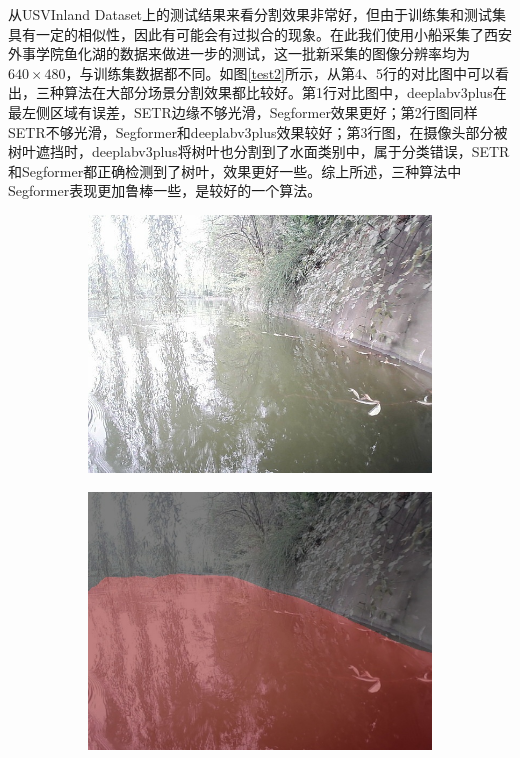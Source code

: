 \documentclass[cn,12pt,color=mine,scheme=chinese,bibstyle=gb7714-2015]{elegantbook}
\begin{document}
\begin{note}[自己采集数据集上的测试]
	从USVInland Dataset上的测试结果来看分割效果非常好，但由于训练集和测试集具有一定的相似性，因此有可能会有过拟合的现象。在此我们使用小船采集了西安外事学院鱼化湖的数据来做进一步的测试，这一批新采集的图像分辨率均为$640\times 480$，与训练集数据都不同。如图\ref{test2}所示，从第4、5行的对比图中可以看出，三种算法在大部分场景分割效果都比较好。第1行对比图中，deeplabv3plus在最左侧区域有误差，SETR边缘不够光滑，Segformer效果更好；第2行图同样SETR不够光滑，Segformer和deeplabv3plus效果较好；第3行图，在摄像头部分被树叶遮挡时，deeplabv3plus将树叶也分割到了水面类别中，属于分类错误，SETR和Segformer都正确检测到了树叶，效果更好一些。综上所述，三种算法中Segformer表现更加鲁棒一些，是较好的一个算法。
\end{note}

\begin{figure}[h]
	\centering
	\begin{subfigure}[b]{0.23\linewidth}
		\centering\includegraphics[width=\linewidth]{results2/test2}
	\end{subfigure}
	\begin{subfigure}[b]{0.23\linewidth}
		\centering\includegraphics[width=\linewidth]{results2/test2deeplab}

\end{subfigure}
\end{figure}
\end{document}
